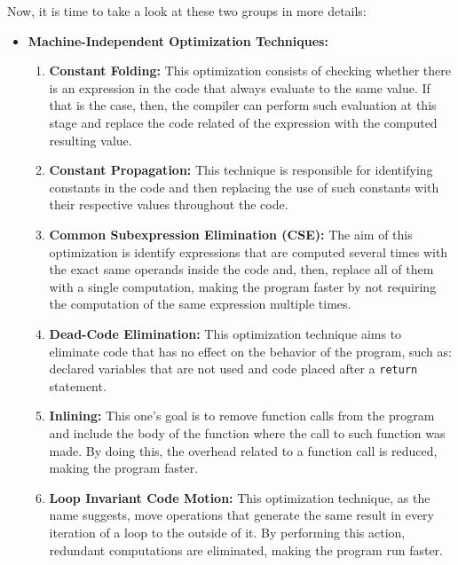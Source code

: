 Now, it is time to take a look at these two groups in more details:

\begin{itemize}
    \item \textbf{Machine-Independent Optimization Techniques:}
        \begin{enumerate}
            \item \textbf{Constant Folding:} This optimization consists of checking whether there is an expression in the code that always evaluate to the same value. If that is the case, then, the compiler can perform such evaluation at this stage and replace the code related of the expression with the computed resulting value.
            
            \item \textbf{Constant Propagation:} This technique is responsible for identifying constants in the code and then replacing the use of such constants with their respective values throughout the code.
            
            \item \textbf{Common Subexpression Elimination (CSE):} The aim of this optimization is identify expressions that are computed several times with the exact same operands inside the code and, then, replace all of them with a single computation, making the program faster by not requiring the computation of the same expression multiple times.
            
            \item \textbf{Dead-Code Elimination:} This optimization technique aims to eliminate code that has no effect on the behavior of the program, such as: declared variables that are not used and code placed after a \texttt{return} statement. 
            
            \item \textbf{Inlining:} This one's goal is to remove function calls from the program and include the body of the function where the call to such function was made. By doing this, the overhead related to a function call is reduced, making the program faster.
            
            \item \textbf{Loop Invariant Code Motion:} This optimization technique, as the name suggests, move operations that generate the same result in every iteration of a loop to the outside of it. By performing this action, redundant computations are eliminated, making the program run faster.
            

\end{enumerate}
\end{itemize}
